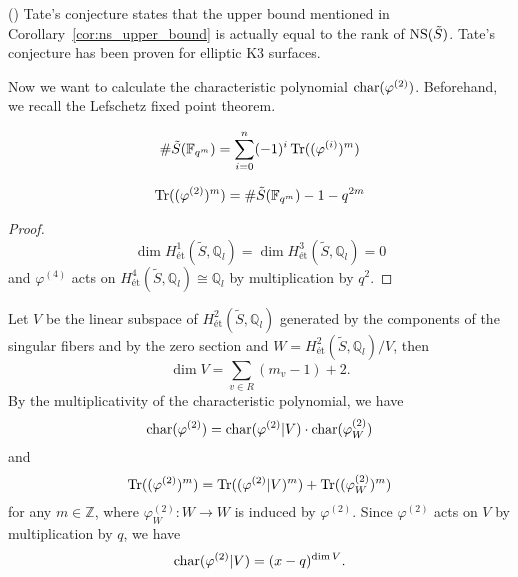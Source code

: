 \documentclass[main]{subfiles}
\begin{document}
\begin{rem}{(\cite[Remark 6.5.]{ref:vanluijk2007})}
    Tate's conjecture states that the upper bound mentioned in Corollary~\ref{cor:ns_upper_bound} is actually equal to the rank of $\operatorname{NS} (\tilde{S})$.
    Tate's conjecture has been proven for elliptic K3 surfaces.
\end{rem}

Now we want to calculate the characteristic polynomial $\operatorname{char} (\varphi^{(2)})$.
Beforehand, we recall the Lefschetz fixed point theorem.

\begin{thm}
    \begin{equation}
        \# \tilde{S}(\mathbb{F}_{q^{m}}) = \sum_{i = 0}^{n} ( - 1)^{i} \operatorname{Tr}((\varphi^{(i)})^{m})
    \end{equation}
\end{thm}

\begin{cor}
    \label{cor:lefschetz}
    \begin{equation}
        \operatorname{Tr} ((\varphi^{(2)})^{m}) = \# \tilde{S}(\mathbb{F}_{q^{m}}) - 1 - q^{2m}
    \end{equation}
\end{cor}
\begin{proof}
    \begin{equation}
        \dim H_{\text{\'et}}^{1}(\tilde{S}, \mathbb{Q}_l) = \dim H_{\text{\'et}}^{3}(\tilde{S}, \mathbb{Q}_l) = 0
    \end{equation}
    and $\varphi^{(4)}$ acts on $H_{\text{\'et}}^{4}(\tilde{S}, \mathbb{Q}_l) \cong \mathbb{Q}_l$ by multiplication by $q^{2}$.
\end{proof}

Let $V$ be the linear subspace of $H_{\text{\'et}}^{2}(\tilde{S}, \mathbb{Q}_{l})$ generated by the components of the singular fibers and by the zero section and $W = H_{\text{\'et}}^{2}(\tilde{S}, \mathbb{Q}_l) / V$, then
\begin{equation}
    \dim V = \sum_{v \in R} (m_{v} - 1) + 2.
\end{equation}
By the multiplicativity of the characteristic polynomial, we have
\begin{equation}
    \operatorname{char} (\varphi^{(2)}) = \operatorname{char} (\varphi^{(2)} | V) \cdot \operatorname{char} (\varphi^{(2)}_{W})
\end{equation}
and
\begin{equation}
    \operatorname{Tr} ((\varphi^{(2)})^{m}) = \operatorname{Tr} ((\varphi^{(2)} | V)^{m}) + \operatorname{Tr} ((\varphi^{(2)}_{W})^{m}) \label{eq:tr-composition}
\end{equation}
for any $m \in \mathbb{Z}$, where $\varphi^{(2)}_W: W \to W$ is induced by $\varphi^{(2)}$.
Since $\varphi^{(2)}$ acts on $V$ by multiplication by $q$, we have
\begin{equation}
    \operatorname{char} (\varphi^{(2)} | V) = (x - q)^{\dim V}.
\end{equation}
\end{document}

